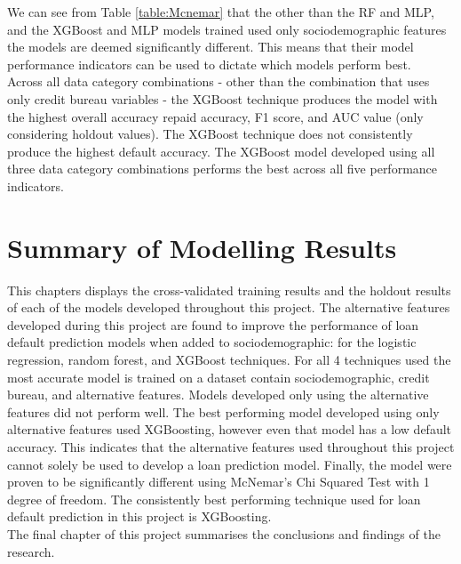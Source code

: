 We can see from Table \ref{table:Mcnemar} that the other than the RF and MLP, and the XGBoost and MLP models trained used only sociodemographic features the models are deemed significantly different. This means that their model performance indicators can be used to dictate which models perform best. \\

Across all data category combinations - other than the combination that uses only credit bureau variables - the XGBoost technique produces the model with the highest overall accuracy repaid accuracy, F1 score, and AUC value (only considering holdout values). The XGBoost technique does not consistently produce the highest default accuracy. The XGBoost model developed using all three data category combinations performs the best across all five performance indicators. \\

\section{Summary of Modelling Results}

This chapters displays the cross-validated training results and the holdout results of each of the models developed throughout this project. The alternative features developed during this project are found to improve the performance of loan default prediction models when added to sociodemographic: for the logistic regression, random forest, and XGBoost techniques. For all 4 techniques used the most accurate model is trained on a dataset contain sociodemographic, credit bureau, and alternative features. Models developed only using the alternative features did not perform well. The best performing model developed using only alternative features used XGBoosting, however even that model has a low default accuracy. This indicates that the alternative features used throughout this project cannot solely be used to develop a loan prediction model. Finally, the model were proven to be significantly different using McNemar's Chi Squared Test with 1 degree of freedom. The consistently best performing technique used for loan default prediction in this project is XGBoosting. \\

The final chapter of this project summarises the conclusions and findings of the research. 